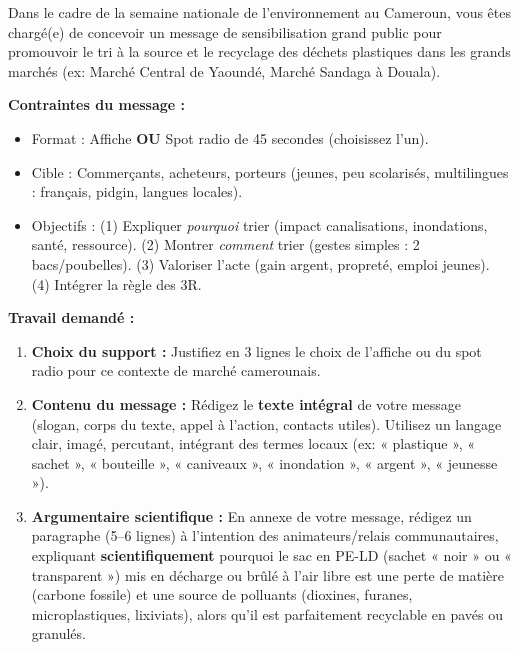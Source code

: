 \documentclass[11pt]{article}
\begin{document}
\begin{exercice}
Dans le cadre de la semaine nationale de l'environnement au Cameroun, vous êtes chargé(e) de concevoir un message de sensibilisation grand public pour promouvoir le tri à la source et le recyclage des déchets plastiques dans les grands marchés (ex: Marché Central de Yaoundé, Marché Sandaga à Douala).

\textbf{Contraintes du message :}
\begin{itemize}
    \item Format : Affiche \textbf{OU} Spot radio de 45 secondes (choisissez l'un).
    \item Cible : Commerçants, acheteurs, porteurs (jeunes, peu scolarisés, multilingues : français, pidgin, langues locales).
    \item Objectifs : (1) Expliquer \emph{pourquoi} trier (impact canalisations, inondations, santé, ressource). (2) Montrer \emph{comment} trier (gestes simples : 2 bacs/poubelles). (3) Valoriser l'acte (gain argent, propreté, emploi jeunes). (4) Intégrer la règle des 3R.
\end{itemize}

\textbf{Travail demandé :}
\begin{enumerate}
    \item \textbf{Choix du support :} Justifiez en 3 lignes le choix de l'affiche ou du spot radio pour ce contexte de marché camerounais.
    \item \textbf{Contenu du message :} Rédigez le \textbf{texte intégral} de votre message (slogan, corps du texte, appel à l'action, contacts utiles). Utilisez un langage clair, imagé, percutant, intégrant des termes locaux (ex: « plastique », « sachet », « bouteille », « caniveaux », « inondation », « argent », « jeunesse »).
    \item \textbf{Argumentaire scientifique :} En annexe de votre message, rédigez un paragraphe (5--6 lignes) à l'intention des animateurs/relais communautaires, expliquant \textbf{scientifiquement} pourquoi le sac en PE-LD (sachet « noir » ou « transparent ») mis en décharge ou brûlé à l'air libre est une perte de matière (carbone fossile) et une source de polluants (dioxines, furanes, microplastiques, lixiviats), alors qu'il est parfaitement recyclable en pavés ou granulés.
\end{enumerate}
\end{exercice}

\newpage
\end{document}
